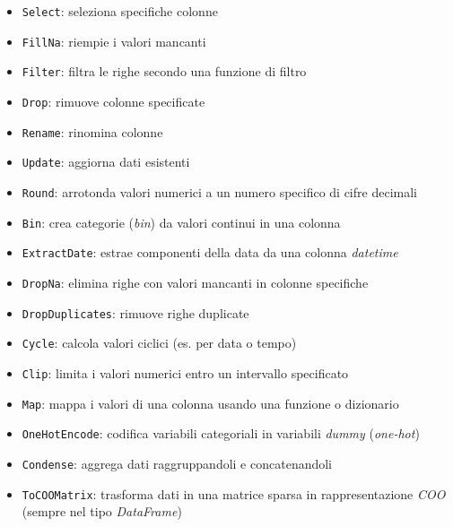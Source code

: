 \begin{itemize}
    \item \texttt{Select}: seleziona specifiche colonne
    \item \texttt{FillNa}: riempie i valori mancanti
    \item \texttt{Filter}: filtra le righe secondo una funzione di filtro
    \item \texttt{Drop}: rimuove colonne specificate
    \item \texttt{Rename}: rinomina colonne
    \item \texttt{Update}: aggiorna dati esistenti
    \item \texttt{Round}: arrotonda valori numerici a un numero specifico di cifre decimali
    \item \texttt{Bin}: crea categorie (\textit{bin}) da valori continui in una colonna
    \item \texttt{ExtractDate}: estrae componenti della data da una colonna \textit{datetime}
    \item \texttt{DropNa}: elimina righe con valori mancanti in colonne specifiche
    \item \texttt{DropDuplicates}: rimuove righe duplicate
    \item \texttt{Cycle}: calcola valori ciclici (es. per data o tempo)
    \item \texttt{Clip}: limita i valori numerici entro un intervallo specificato
    \item \texttt{Map}: mappa i valori di una colonna usando una funzione o dizionario
    \item \texttt{OneHotEncode}: codifica variabili categoriali in variabili \textit{dummy} (\textit{one-hot})
    \item \texttt{Condense}: aggrega dati raggruppandoli e concatenandoli
    \item \texttt{ToCOOMatrix}: trasforma dati in una matrice sparsa in rappresentazione \textit{COO} (sempre nel tipo \textit{DataFrame})
\end{itemize}

